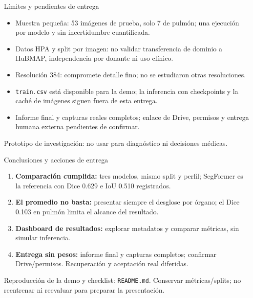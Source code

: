 \documentclass[aspectratio=169,11pt]{beamer}
\begin{document}
\begin{frame}{Límites y pendientes de entrega}
  \begin{itemize}
    \item Muestra pequeña: 53 imágenes de prueba, solo 7 de pulmón;
          una ejecución por modelo y sin incertidumbre cuantificada.
    \item Datos HPA y split por imagen: no validar transferencia de dominio
          a HuBMAP, independencia por donante ni uso clínico.
    \item Resolución 384: compromete detalle fino; no se estudiaron otras resoluciones.
    \item \texttt{train.csv} está disponible para la demo; la inferencia con
          checkpoints y la caché de imágenes siguen fuera de esta entrega.
    \item Informe final y capturas reales completos; enlace de Drive,
          permisos y entrega humana externa pendientes de confirmar.
  \end{itemize}
  \alert{Prototipo de investigación: no usar para diagnóstico ni decisiones médicas.}
\end{frame}

\begin{frame}{Conclusiones y acciones de entrega}
  \begin{enumerate}
    \item \textbf{Comparación cumplida:} tres modelos, mismo split y perfil;
          SegFormer es la referencia con Dice 0.629 e IoU 0.510 registrados.
    \item \textbf{El promedio no basta:} presentar siempre el desglose por órgano;
          el Dice 0.103 en pulmón limita el alcance del resultado.
    \item \textbf{Dashboard de resultados:}
          explorar metadatos y comparar métricas, sin simular inferencia.
    \item \textbf{Entrega sin pesos:} informe final y capturas completos;
          confirmar Drive/permisos. Recuperación y aceptación real diferidas.
  \end{enumerate}
  \small Reproducción de la demo y checklist: \texttt{README.md}.
  Conservar métricas/splits; no reentrenar ni reevaluar para preparar la presentación.
\end{frame}
\end{document}
